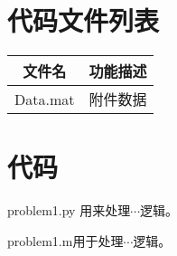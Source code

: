 \documentclass{cumcmthesis}
\begin{document}
\newpage
\begin{appendices}
    \section{代码文件列表}
    \begin{table}[htbp]
        \centering
        \begin{tabular}{cc}
            \toprule[1.5pt]
            文件名   & 功能描述 \\
            \midrule
            Data.mat & 附件数据 \\
            \bottomrule
        \end{tabular}
    \end{table}

    \section{代码}
    problem1.py 用来处理$\cdots$逻辑。
    \par 
    \par problem1.m用于处理$\cdots$逻辑。
    \par 
\end{appendices}
\end{document}
